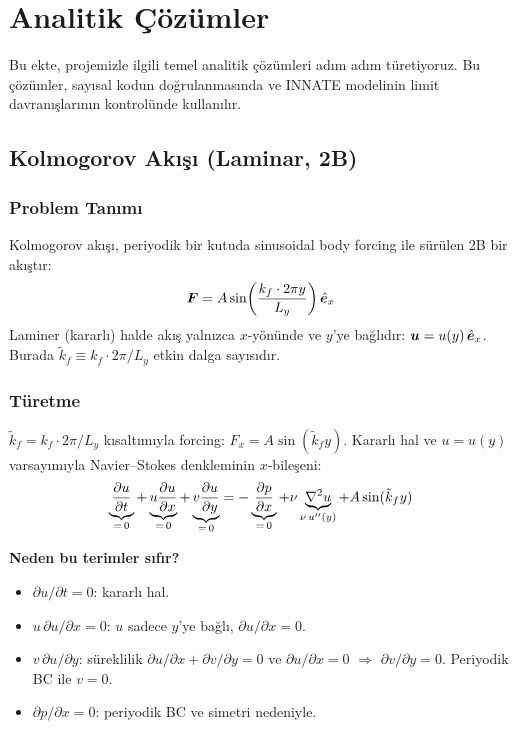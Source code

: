 \chapter{Analitik Çözümler}
\label{ch:analitik}

Bu ekte, projemizle ilgili temel analitik çözümleri adım adım türetiyoruz. Bu çözümler, sayısal kodun doğrulanmasında ve INNATE modelinin limit davranışlarının kontrolünde kullanılır.


\section{Kolmogorov Akışı (Laminar, 2B)}
\label{sec:kolmogorov_analitik}

\subsection{Problem Tanımı}

Kolmogorov akışı, periyodik bir kutuda sinusoidal body forcing ile sürülen 2B bir akıştır:
\begin{equation}
    \bm{F} = A \sin\!\left(\frac{k_f \cdot 2\pi y}{L_y}\right) \hat{\bm{e}}_x
\end{equation}
Laminer (kararlı) halde akış yalnızca $x$-yönünde ve $y$'ye bağlıdır: $\bm{u} = u(y) \, \hat{\bm{e}}_x$. Burada $\tilde{k}_f \equiv k_f \cdot 2\pi / L_y$ etkin dalga sayısıdır.

\subsection{Türetme}

$\tilde{k}_f = k_f \cdot 2\pi / L_y$ kısaltımıyla forcing: $F_x = A\sin(\tilde{k}_f y)$. Kararlı hal ve $u = u(y)$ varsayımıyla Navier--Stokes denkleminin $x$-bileşeni:
\begin{equation}
    \underbrace{\frac{\partial u}{\partial t}}_{=\,0} + \underbrace{u \frac{\partial u}{\partial x}}_{=\,0} + \underbrace{v \frac{\partial u}{\partial y}}_{=\,0} = -\underbrace{\frac{\partial p}{\partial x}}_{=\,0} + \nu \underbrace{\nabla^2 u}_{\nu \, u''(y)} + A\sin(\tilde{k}_f y)
\end{equation}

\textbf{Neden bu terimler sıfır?}
\begin{itemize}
    \item $\partial u/\partial t = 0$: kararlı hal.
    \item $u \, \partial u/\partial x = 0$: $u$ sadece $y$'ye bağlı, $\partial u/\partial x = 0$.
    \item $v \, \partial u/\partial y$: süreklilik $\partial u/\partial x + \partial v/\partial y = 0$ ve $\partial u/\partial x = 0$ $\Rightarrow$ $\partial v/\partial y = 0$. Periyodik BC ile $v = 0$.
    \item $\partial p/\partial x = 0$: periyodik BC ve simetri nedeniyle.
\end{itemize}

